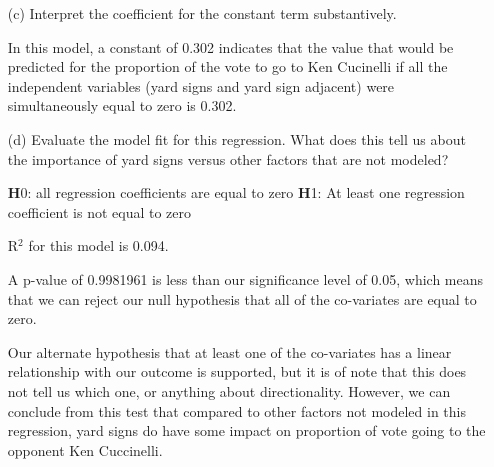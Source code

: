 \documentclass[12pt,letterpaper]{article}
\begin{document}
\begin{enumerate}
	Get critical value at 0.05
	
		
	\vspace{.1cm}
	
	\noindent Since our p value of 0.002 is greater than our significance level of 0.05, we reject the null 
	hypothesis that the slope of the regression line for the effect of living in a precinct 
	adjacent to lawn signs on proportion of vote to Ken Cuccinelli = 0.
		\vspace{.25cm}
	
	\item [(c)] Interpret the coefficient for the constant term substantively.
	\vspace{.25cm}
	
	\noindent In this model, a constant of 0.302 indicates that the value that would be 
	predicted for the proportion of the vote to go to Ken Cucinelli if all the 
	independent variables (yard signs and yard sign adjacent) were simultaneously 
	equal to zero is 0.302. 
	
		\vspace{.25cm}
	\item [(d)] Evaluate the model fit for this regression.  What does this	tell us about the importance of yard signs versus other factors that are not modeled?
	
	\textbf H0: all regression coefficients are equal to zero
	\newline
	\textbf H1: At least one regression coefficient is not equal to zero
	
	R$^2$ for this model is 0.094. 
	
	
	\vspace{.1cm}
	
	
	A p-value of 0.9981961 is less than our significance level of 0.05, which means that we can reject our null hypothesis that all of the co-variates are equal to zero.
	
	Our alternate hypothesis that at least one of the co-variates has a linear relationship with our outcome is supported, but it is of note that this does not tell us which one, or anything about directionality. 
	However, we can conclude from this test that compared to other factors not modeled in this regression, yard signs do have some impact 
	on proportion of vote going to the opponent Ken Cuccinelli. 
	
	
\end{enumerate}  
\end{document}
